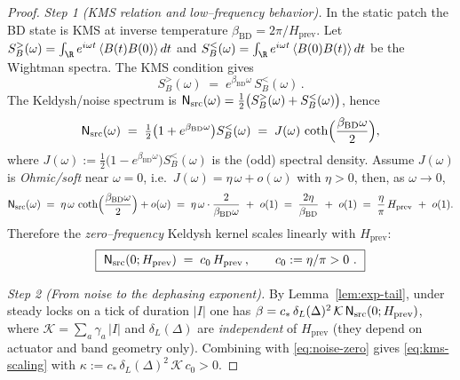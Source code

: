 \documentclass[10pt]{article}
\theoremstyle{definition}
\theoremstyle{plain}
\begin{document}
\begin{proof}
\emph{Step 1 (KMS relation and low–frequency behavior).}
In the static patch the BD state is KMS at inverse temperature $\beta_{\mathrm{BD}}=2\pi/H_{\mathrm{prev}}$.
Let $S^{>}_B(\omega)=\int_{\R}e^{i\omega t}\,\langle B(t)B(0)\rangle\,dt$ and
$S^{<}_B(\omega)=\int_{\R}e^{i\omega t}\,\langle B(0)B(t)\rangle\,dt$ be the Wightman spectra. The KMS
condition gives
\[
S^{>}_B(\omega)\;=\;e^{\beta_{\mathrm{BD}}\omega}\,S^{<}_B(\omega)\,.
\]
The Keldysh/noise spectrum is
$\mathsf N_{\rm src}(\omega)=\tfrac12\big(S^{>}_B(\omega)+S^{<}_B(\omega)\big)$, hence
\[
\mathsf N_{\rm src}(\omega)\;=\;\tfrac12\big(1+e^{\beta_{\mathrm{BD}}\omega}\big)S^{<}_B(\omega)
\;=\;J(\omega)\,\coth\!\Big(\frac{\beta_{\mathrm{BD}}\omega}{2}\Big),
\]
where $J(\omega):=\tfrac12\big(1-e^{\beta_{\mathrm{BD}}\omega}\big)S^{<}_B(\omega)$ is the (odd) spectral density.
Assume $J(\omega)$ is \emph{Ohmic/soft} near $\omega=0$, i.e.\ $J(\omega)=\eta\,\omega+o(\omega)$ with $\eta>0$,
then, as $\omega\to 0$,
\[
\mathsf N_{\rm src}(\omega)\;=\;\eta\,\omega\,\coth\!\Big(\frac{\beta_{\mathrm{BD}}\omega}{2}\Big)+o(\omega)
\;=\;\eta\,\omega\cdot \frac{2}{\beta_{\mathrm{BD}}\omega}\ +\ o(1)\;=\;\frac{2\eta}{\beta_{\mathrm{BD}}}\ +\ o(1)
\;=\;\frac{\eta}{\pi}\,H_{\mathrm{prev}}\ +\ o(1).
\]
Therefore the \emph{zero–frequency} Keldysh kernel scales linearly with $H_{\mathrm{prev}}$:
\begin{equation}\label{eq:noise-zero}
\boxed{\ \mathsf N_{\rm src}(0;H_{\mathrm{prev}})\;=\;c_0\,H_{\mathrm{prev}}\,,\qquad c_0:=\eta/\pi>0\ .\ }
\end{equation}

\emph{Step 2 (From noise to the dephasing exponent).}
By Lemma~\ref{lem:exp-tail}, under steady locks on a tick of duration $|I|$ one has
$\beta=c_\ast\,\delta_L(\Delta)^2\,\mathcal K\,\mathsf N_{\rm src}(0;H_{\mathrm{prev}})$, where
$\mathcal K=\sum_a \gamma_a\,|I|$ and $\delta_L(\Delta)$ are \emph{independent} of $H_{\mathrm{prev}}$ (they depend
on actuator and band geometry only). Combining with \eqref{eq:noise-zero} gives \eqref{eq:kms-scaling}
with $\kappa:=c_\ast\,\delta_L(\Delta)^2\,\mathcal K\,c_0>0$.
\end{proof}
\end{document}
